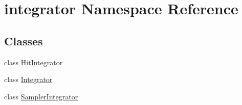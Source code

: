\hypertarget{namespaceintegrator}{}\section{integrator Namespace Reference}
\label{namespaceintegrator}
\subsection*{Classes}
\begin{DoxyCompactItemize}
\item 
class \mbox{\hyperlink{classintegrator_1_1HitIntegrator}{Hit\+Integrator}}
\item 
class \mbox{\hyperlink{classintegrator_1_1Integrator}{Integrator}}
\item 
class \mbox{\hyperlink{classintegrator_1_1SamplerIntegrator}{Sampler\+Integrator}}
\end{DoxyCompactItemize}

